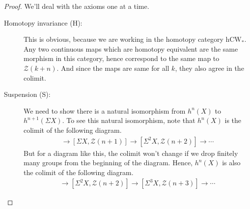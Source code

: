 \documentclass[12pt, notitlepage]{article}
\theoremstyle{definition}
\newcommand{\cat}[1]{\mathrm{#1}}
\newcommand{\calz}{\mathcal{Z}}
\begin{document}
\begin{proof}
  We'll deal with the axioms one at a time.
  \begin{description}
  \item[Homotopy invariance (H):] This is obvious, because we are working in the homotopy category
    $\cat{hCW}_{\ast}$.  Any two continuous maps which are homotopy equivalent are the same morphism
    in this category, hence correspond to the same map to $\calz(k+n)$. And since the maps are same
    for all $k$, they also agree in the colimit.
  \item[Suspension (S):] We need to show there is a natural isomorphism from $h^n(X)$ to
    $h^{n+1}(\Sigma X)$. To see this natural isomorphism, note that $h^n(X)$ is the colimit of the
    following diagram.
    \begin{align*}
      [X, \calz(n)] \to [\Sigma X, \calz(n+1)] \to [\Sigma^2 X, \calz(n+2)] \to \cdots
    \end{align*}
    But for a diagram like this, the colimit won't change if we drop finitely many groups from the
    beginning of the diagram. Hence, $h^n(X)$ is also the colimit of the following diagram.
    \begin{align*}
      [\Sigma X, \calz(n+1)] \to [\Sigma^2 X, \calz(n+2)] \to [\Sigma^3 X, \calz(n+3)] \to \cdots
    \end{align*}
    

\end{description}
\end{proof}
\end{document}
